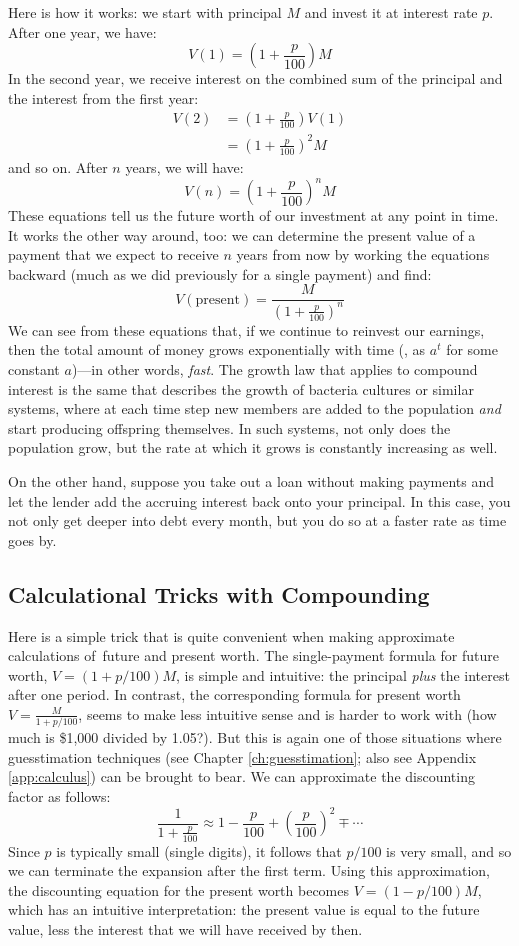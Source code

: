 Here is how it works: we start with principal $M$ and invest it
at interest rate $p$. After one year, we have:
%
\[
V(1) = \left( 1 + \frac{p}{100} \right) M
\]
%  
In the second year, we receive interest on the combined sum of the
principal and the interest from the first year:
%
\begin{align*}
V(2) & = \left( 1 + \frac{p}{100} \right) V(1) \\
     & = \left( 1 + \frac{p}{100} \right)^2 M
\end{align*}
%
and so on. After $n$ years, we will have:
%
\[
V(n) = \left( 1 + \frac{p}{100} \right)^n M
\]
%    
These equations tell us the future worth of our investment at any
point in time. It works the other way around, too: we can determine
the present value of a payment that we expect to receive $n$ years
from now by working the equations backward (much as we did previously
for a single payment) and find:
%
\[
V(\text{present}) = \frac{M}{ \left( 1+\frac{p}{100} \right)^n }
\]
%    
We can see from these equations that, if we continue to reinvest our
earnings, then the total amount of money grows exponentially with time
(\ie, as $a^t$ for some constant $a$)---in other words,
\emph{fast}. The growth law that applies to compound interest is the
same that describes the growth of bacteria cultures or similar
systems, where at each time step new members are added to the
population \emph{and} start producing offspring themselves. In such
systems, not only does the population grow, but the rate at which it
grows is constantly increasing as well.
    
On the other hand, suppose you take out a loan without making payments
and let the lender add the accruing interest back onto your principal.
In this case, you not only get deeper into debt every month, but you
do so at a faster rate as time goes by.

\subsection{Calculational Tricks with Compounding}
    
Here is a simple trick that is quite convenient when making
approximate calculations of~future and present worth. The
single-payment formula for future worth, $V = (1+p/100) M$, is simple
and intuitive: the principal \emph{plus} the interest after one
period. In contrast, the corresponding formula for present worth $V =
\frac{M}{1+p/100}$, seems to make less intuitive sense and is harder
to work with (how much is \$1,000 divided by 1.05?). But this is again
one of those situations where guesstimation techniques (see Chapter
\ref{ch:guesstimation}; also see Appendix \ref{app:calculus}) can be
brought to bear. We can approximate the discounting factor as follows:
%
\[
\frac{1}{1+\frac{p}{100}} 
  \approx 1 - \frac{p}{100} + \left( \frac{p}{100} \right)^2 \mp \dotsb
\]
%    
Since $p$ is typically small (single digits), it follows that $p/100$
is very small, and so we can terminate the expansion after the first
term. Using this approximation, the discounting equation for the
present worth becomes $V = ( 1 - p/100 ) M$, which has an intuitive
interpretation: the present value is equal to the future value, less
the interest that we will have received by then.
    
